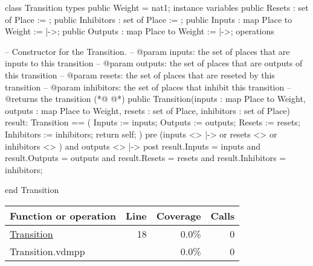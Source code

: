 \begin{vdmpp}
class Transition
types
 public Weight = nat1;
instance variables
 public Resets : set of Place := {};
 public Inhibitors : set of Place := {};
 public Inputs : map Place to Weight := {|->};
 public Outputs : map Place to Weight := {|->};
operations


 -- Constructor for the Transition.
 -- @param inputs: the set of places that are inputs to this transition
 -- @param outputs: the set of places that are outputs of this transition
 -- @param resets: the set of places that are reseted by this transition
 -- @param inhibitors: the set of places that inhibit this transition
 -- @returns the transition
(*@
\label{Transition:18}
@*)
 public Transition(inputs : map Place to Weight, outputs : map Place to Weight, resets : set of Place, inhibitors : set of Place) 
      result: Transition == (
  Inputs := inputs;
  Outputs := outputs;
  Resets := resets;
  Inhibitors := inhibitors;
  return self;
 )
 pre (inputs <> {|->} or resets <> {} or inhibitors <> {}) and outputs <> {|->}
 post result.Inputs = inputs and result.Outputs = outputs and result.Resets = resets and result.Inhibitors = inhibitors;
 
end Transition
\end{vdmpp}
\bigskip
\begin{longtable}{|l|r|r|r|}
\hline
Function or operation & Line & Coverage & Calls \\
\hline
\hline
\hyperref[Transition:18]{Transition} & 18&0.0\% & 0 \\
\hline
\hline
Transition.vdmpp & & 0.0\% & 0 \\
\hline
\end{longtable}

